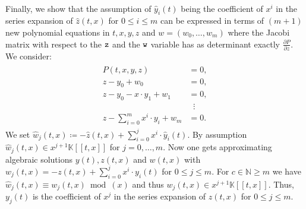 \documentclass[10pt, a4paper]{article}
\def\wh{\widehat}
\theoremstyle{remark}
\theoremstyle{remark}
\begin{document}
\\Finally, we show that the assumption of $\wh{y}_i(t)$ being the coefficient of $x^i$ in the series expansion of $\wh{z}(t,x)$ for $0\leq i\leq m$ can be expressed in terms of $(m+1)$ new polynomial equations in $t,x,y,z$ and $w=(w_0,\ldots,w_m)$ where the Jacobi matrix with respect to the $\tt z$ and the $\tt w$ variable has as determinant exactly $\frac{\partial P}{\partial z}$.
\\We consider:
\begin{align}
\begin{split}\label{system}
    P(t,x,y,z)&=0,\\
    z-y_0+w_0&=0,\\
    z-y_0-x\cdot y_1+w_1&=0,\\
    &\;\;\vdots\\
    z-\sum_{i=0}^mx^i\cdot y_i+w_m&=0.         
\end{split}
\end{align}
We set $\wh{w}_j(t,x) \coloneqq -\wh{z}(t,x)+\sum_{i=0}^jx^i\cdot \wh{y}_i(t)$. By assumption $\wh{w}_j(t,x)\in x^{j+1}\mathbb{K}[[t,x]]$ for $j=0,\ldots,m$.
Now one gets approximating algebraic solutions $y(t),z(t,x)$ and $w(t,x)$
with $w_j(t,x)=-z(t,x)+\sum_{i=0}^jx^i\cdot y_i(t)$ for $0\leq j\leq m$. For $c\in\mathbb{N}\geq m$ we have $\wh{w}_j(t,x)\equiv w_j(t,x)\bmod (x)$ and thus $w_j(t,x)\in x^{j+1}\mathbb{K}[[t,x]]$. Thus, $y_j(t)$ is the coefficient of $x^j$ in the series expansion of $z(t,x)$ for $0\leq j\leq m$.
\end{document}
